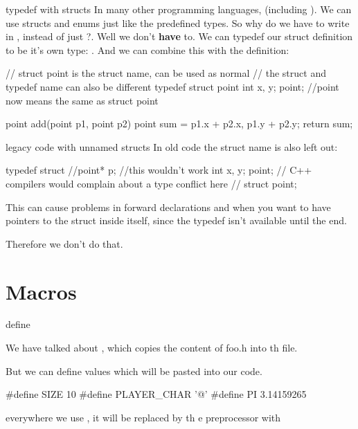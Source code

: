 \documentclass[10pt,graphics,aspectratio=169,table]{beamer}
\begin{document}
\begin{frame}[fragile]{typedef with structs}
    In many other programming languages, 
    (including ).
    We can use structs and enums just like the predefined types.
    So why do we have to write  in , instead of just
     ?. Well we don't \textbf{have} to.
    We can typedef our struct definition to be it's own type:
    . And we can combine this with the definition:
    \begin{codeblock}
// struct point is the struct name, can be used as normal
// the struct and typedef name can also be different
typedef struct point{ 
    int x, y; 
}point; //point now means the same as struct point

point add(point p1, point p2){
    point sum = {p1.x + p2.x, p1.y + p2.y};
    return sum;
}
    \end{codeblock}
\end{frame}
    \begin{frame}[fragile]{legacy code with unnamed structs}
    In old code the struct name is also left out:

    \begin{codeblock}
typedef struct{ 
    //point* p; //this wouldn't work
    int x, y; 
}point; 
// C++ compilers would complain about a type conflict here
// struct point;  
    \end{codeblock}

    This can cause problems in forward declarations and when you
    want to have pointers to the struct
    inside itself, since the typedef isn't available until the end.

    Therefore we don't do that.
\end{frame}

\section{Macros}

\begin{frame}[fragile]{define}

We have talked about , which copies the content of foo.h into th file.

But we can define values which will be pasted into our code.

\begin{codeblock}
#define SIZE 10
#define PLAYER_CHAR '@'
#define PI 3.14159265
\end{codeblock}

everywhere we use , it will be replaced by th e preprocessor with 
\end{frame}
\end{document}
